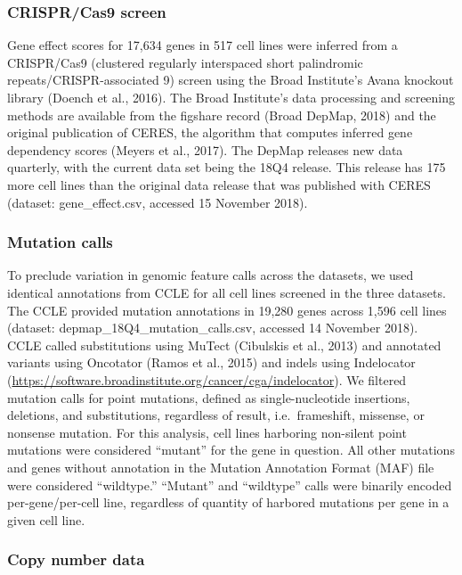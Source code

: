 \documentclass[man,floatsintext]{apa6}
\begin{document}
\subsubsection{CRISPR/Cas9 screen}\label{crisprcas9-screen}

Gene effect scores for 17,634 genes in 517 cell lines were inferred from
a CRISPR/Cas9 (clustered regularly interspaced short palindromic
repeats/CRISPR-associated 9) screen using the Broad Institute's Avana
knockout library (Doench et al., 2016). The Broad Institute's data
processing and screening methods are available from the figshare record
(Broad DepMap, 2018) and the original publication of CERES, the
algorithm that computes inferred gene dependency scores (Meyers et al.,
2017). The DepMap releases new data quarterly, with the current data set
being the 18Q4 release. This release has 175 more cell lines than the
original data release that was published with CERES (dataset:
gene\_effect.csv, accessed 15 November 2018).

\subsubsection{Mutation calls}\label{mutation-calls}

To preclude variation in genomic feature calls across the datasets, we
used identical annotations from CCLE for all cell lines screened in the
three datasets. The CCLE provided mutation annotations in 19,280 genes
across 1,596 cell lines (dataset: depmap\_18Q4\_mutation\_calls.csv,
accessed 14 November 2018). CCLE called substitutions using MuTect
(Cibulskis et al., 2013) and annotated variants using Oncotator (Ramos
et al., 2015) and indels using Indelocator
(\url{https://software.broadinstitute.org/cancer/cga/indelocator}). We
filtered mutation calls for point mutations, defined as
single-nucleotide insertions, deletions, and substitutions, regardless
of result, i.e.~frameshift, missense, or nonsense mutation. For this
analysis, cell lines harboring non-silent point mutations were
considered \enquote{mutant} for the gene in question. All other
mutations and genes without annotation in the Mutation Annotation Format
(MAF) file were considered \enquote{wildtype.} \enquote{Mutant} and
\enquote{wildtype} calls were binarily encoded per-gene/per-cell line,
regardless of quantity of harbored mutations per gene in a given cell
line.

\subsubsection{Copy number data}\label{copy-number-data}
\end{document}
